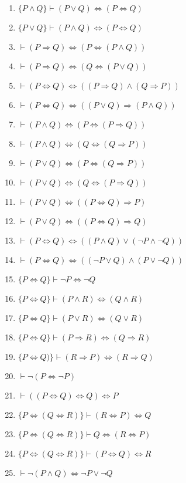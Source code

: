 \begin{enumerate}
    \item $\{P \land Q\} \vdash (P \lor  Q) \Leftrightarrow (P \Leftrightarrow Q)$
    \item $\{P \lor  Q\} \vdash (P \land Q) \Leftrightarrow (P \Leftrightarrow Q)$
    \item $\vdash (P\Rightarrow Q) \Leftrightarrow (P \Leftrightarrow (P \land Q))$
    \item $\vdash (P\Rightarrow Q) \Leftrightarrow (Q \Leftrightarrow (P \lor  Q))$
    \item $\vdash (P \Leftrightarrow Q) \Leftrightarrow ((P\Rightarrow Q) \land (Q\Rightarrow P))$
    \item $\vdash (P \Leftrightarrow Q) \Leftrightarrow ((P \lor  Q)\Rightarrow (P \land Q))$
    \item $\vdash (P \land Q)  \Leftrightarrow  (P \Leftrightarrow (P\Rightarrow Q))$
    \item $\vdash (P \land Q)  \Leftrightarrow  (Q \Leftrightarrow (Q\Rightarrow P))$
    \item $\vdash (P \lor  Q)  \Leftrightarrow  (P \Leftrightarrow (Q\Rightarrow P))$
    \item $\vdash (P \lor  Q)  \Leftrightarrow  (Q \Leftrightarrow (P\Rightarrow Q))$
    \item $\vdash (P \lor  Q)  \Leftrightarrow  ((P \Leftrightarrow Q)\Rightarrow P)$
    \item $\vdash (P \lor  Q)  \Leftrightarrow  ((P \Leftrightarrow Q)\Rightarrow Q)$
    \item $\vdash (P \Leftrightarrow Q) \Leftrightarrow ((P \land Q) \lor  (\neg P \land \neg Q))$
    \item $\vdash (P \Leftrightarrow Q) \Leftrightarrow ((\neg P \lor  Q) \land (P \lor  \neg Q))$
    \item $\{P \Leftrightarrow Q\} \vdash \neg P \Leftrightarrow \neg Q$
    \item $\{P \Leftrightarrow Q\} \vdash (P \land R) \Leftrightarrow (Q \land R)$
    \item $\{P \Leftrightarrow Q\} \vdash (P \lor  R) \Leftrightarrow (Q \lor  R)$
    \item $\{P \Leftrightarrow Q\} \vdash (P\Rightarrow R) \Leftrightarrow (Q\Rightarrow R)$
    \item $\{P \Leftrightarrow Q)\} \vdash (R\Rightarrow P) \Leftrightarrow (R\Rightarrow Q)$
    \item $\vdash \neg (P \Leftrightarrow \neg P)$
    \item $\vdash ((P \Leftrightarrow Q) \Leftrightarrow Q) \Leftrightarrow P$
    \item $\{P \Leftrightarrow (Q \Leftrightarrow R)\} \vdash (R \Leftrightarrow P) \Leftrightarrow Q$
    \item $\{P \Leftrightarrow (Q \Leftrightarrow R)\} \vdash Q \Leftrightarrow (R \Leftrightarrow P)$
    \item $\{P \Leftrightarrow (Q \Leftrightarrow R)\} \vdash (P \Leftrightarrow Q) \Leftrightarrow R$
    \item $\vdash \neg (P \land Q) \Leftrightarrow \neg P \lor \neg Q$
\end{enumerate}

